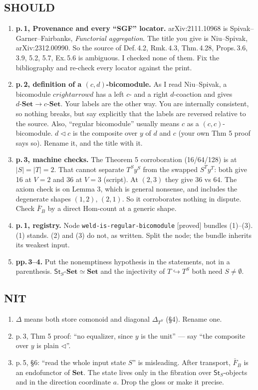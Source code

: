 \documentclass[11pt]{article}
\newcommand{\tri}{\mathbin{\triangleleft}}
\newcommand{\St}{\mathsf{St}}
\begin{document}
\subsection*{SHOULD}
\begin{enumerate}[label=\textbf{S\arabic*.},leftmargin=*]
\item \textbf{p.\,1, Provenance and every ``SGF'' locator.} arXiv:2111.10968 is Spivak--Garner--Fairbanks,
  \emph{Functorial aggregation}. The title you give is Niu--Spivak, arXiv:2312.00990. So the source
  of Def.\,4.2, Rmk.\,4.3, Thm.\,4.28, Props.\,3.6, 3.9, 5.2, 5.7, Ex.\,5.6 is ambiguous. I checked
  none of them. Fix the bibliography and re-check every locator against the print.
\item \textbf{p.\,2, definition of a $(c,d)$-bicomodule.} As I read Niu--Spivak, a bicomodule $c
rightarrow d$ has
  a left $c$- and a right $d$-coaction and gives $d\text{-}\mathbf{Set}\to c\text{-}\mathbf{Set}$.
  Your labels are the other way. You are internally consistent, so nothing breaks, but say
  explicitly that the labels are reversed relative to the source. Also, ``regular bicomodule''
  usually means $c$ as a $(c,c)$-bicomodule. $d\tri c$ is the composite over $y$ of $d$ and $c$
  (your own Thm 5 proof says so). Rename it, and the title with it.
\item \textbf{p.\,3, machine checks.} The Theorem 5 corroboration (16/64/128) is at $|S|=|T|=2$.
  That cannot separate $T^Sy^S$ from the swapped $S^Ty^T$: both give 16 at $V=2$ and 36 at $V=3$
  (script). At $(2,3)$ they give 36 vs 64. The axiom check is on Lemma 3, which is general nonsense,
  and includes the degenerate shapes $(1,2)$, $(2,1)$. So it corroborates nothing in dispute. Check
  $\bar F_B$ by a direct Hom-count at a generic shape.
\item \textbf{p.\,1, registry.} Node \texttt{weld-is-regular-bicomodule} [proved] bundles (1)--(3).
  (1) stands. (2) and (3) do not, as written. Split the node; the bundle inherits its weakest input.
\item \textbf{pp.\,3--4.} Put the nonemptiness hypothesis in the statements, not in a parenthesis.
  $\St_S\text{-}\mathbf{Set}\simeq\mathbf{Set}$ and the injectivity of $T\hookrightarrow T^S$ both
  need $S\neq\emptyset$.
\end{enumerate}

\subsection*{NIT}
\begin{enumerate}[label=\textbf{N\arabic*.},leftmargin=*]
\item $\Delta$ means both store comonoid and diagonal $\Delta_{T^S}$ (\S4). Rename one.
\item p.\,3, Thm 5 proof: ``no equalizer, since $y$ is the unit'' --- say ``the composite over $y$ is
  plain $\tri$''.
\item p.\,5, \S6: ``read the whole input state $S$'' is misleading. After transport, $\bar F_B$ is an
  endofunctor of $\mathbf{Set}$. The state lives only in the fibration over $\St_S$-objects and in the
  direction coordinate $a$. Drop the gloss or make it precise.
\end{enumerate}
\end{document}

